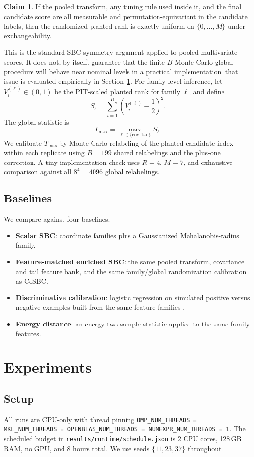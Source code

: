 \documentclass[10pt,twocolumn]{article}
\newcommand{\method}{CoSBC}
\newcommand{\R}{R}
\newcommand{\M}{M}
\newcommand{\B}{B}
\newcommand{\1}{\mathbf{1}}
\begin{document}
\textbf{Claim 1.} If the pooled transform, any tuning rule used inside it, and the final candidate score are all measurable and permutation-equivariant in the candidate labels, then the randomized planted rank is exactly uniform on $\{0,\dots,\M\}$ under exchangeability.

This is the standard SBC symmetry argument applied to pooled multivariate scores. It does not, by itself, guarantee that the finite-$\B$ Monte Carlo global procedure will behave near nominal levels in a practical implementation; that issue is evaluated empirically in Section~\ref{sec:experiments}. For family-level inference, let $V_i^{(\ell)} \in (0,1)$ be the PIT-scaled planted rank for family $\ell$, and define
\[
S_\ell = \sum_{i=1}^{\R}\left(V_i^{(\ell)}-\frac{1}{2}\right)^2.
\]
The global statistic is
\[
T_{\max} = \max_{\ell \in \{\mathrm{cov}, \mathrm{tail}\}} S_\ell.
\]
We calibrate $T_{\max}$ by Monte Carlo relabeling of the planted candidate index within each replicate using $\B=199$ shared relabelings and the plus-one correction. A tiny implementation check uses $\R=4$, $\M=7$, and exhaustive comparison against all $8^4=4096$ global relabelings.

\subsection{Baselines}
We compare against four baselines.
\begin{itemize}
\item \textbf{Scalar SBC}: coordinate families plus a Gaussianized Mahalanobis-radius family.
\item \textbf{Feature-matched enriched SBC}: the same pooled transform, covariance and tail feature bank, and the same family/global randomization calibration as \method.
\item \textbf{Discriminative calibration}: logistic regression on simulated positive versus negative examples built from the same feature families \cite{YaoDomke2023}.
\item \textbf{Energy distance}: an energy two-sample statistic applied to the same family features.
\end{itemize}

\section{Experiments}
\label{sec:experiments}
\subsection{Setup}
All runs are CPU-only with thread pinning \texttt{OMP\_NUM\_THREADS = MKL\_NUM\_THREADS = OPENBLAS\_NUM\_THREADS = NUMEXPR\_NUM\_THREADS = 1}. The scheduled budget in \texttt{results/runtime/schedule.json} is 2 CPU cores, 128\,GB RAM, no GPU, and 8 hours total. We use seeds $\{11,23,37\}$ throughout.
\end{document}
